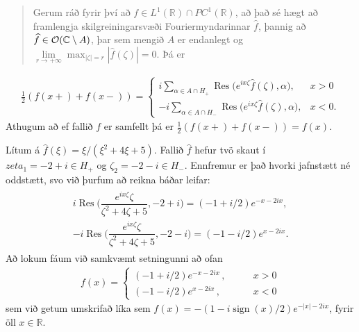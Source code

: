 \documentclass[a4paper,10pt,icelandic]{sphinxmanual}
\begin{document}
\begin{quote}

Gerum ráð fyrir því að \(f\in L^1({{\mathbb R}})\cap PC^1({{\mathbb R}})\), að það sé hægt að framlengja skilgreiningarsvæði Fourier\textendash{}myndarinnar \(\widehat f\), þannig að \(\widehat f\in {{\cal O}}({{\mathbb C}}\setminus A)\), þar sem mengið \(A\) er endanlegt og \(\lim\limits_{r\to +\infty}\max_{|\zeta|=r}|\widehat f(\zeta)|=0\). Þá er
\end{quote}
\begin{equation*}
\begin{split}\tfrac 12 (f(x+)+f(x-))=\begin{cases}
i\sum\limits_{\alpha\in A\cap H_+}{{\operatorname{Res}}}\big(e^{ix\zeta}\widehat
f(\zeta),\alpha\big), & x>0\\
-i\sum\limits_{\alpha\in A\cap H_-}{{\operatorname{Res}}}\big(e^{ix\zeta}\widehat
f(\zeta),\alpha\big), & x<0.
\end{cases}\end{split}
\end{equation*}
Athugum að ef fallið \(f\) er samfellt þá er \(\tfrac 12 (f(x+)+f(x-))= f(x)\).


Lítum á \(\widehat f(\xi)=\xi/(\xi^2+4\xi+5)\). Fallið \(\widehat f\) hefur tvö skaut í \(zeta_1 = -2+i\in H_+\) og \(\zeta_2 = -2-i\in H_-\). Ennfremur er það hvorki jafnstætt né oddstætt, svo við þurfum að reikna báðar leifar:
\begin{equation*}
\begin{split}\begin{gathered}
i{{\operatorname{Res}}}\bigg( \dfrac{e^{ix\zeta}\zeta}{\zeta^2+4\zeta+5},-2+i\bigg)
= (-1+i/2)e^{-x-2ix},\\
-i{{\operatorname{Res}}}\bigg( \dfrac{e^{ix\zeta}\zeta}{\zeta^2+4\zeta+5},-2-i\bigg)
= (-1-i/2)e^{x-2ix}.\end{gathered}\end{split}
\end{equation*}
Að lokum fáum við samkvæmt setningunni að ofan
\begin{equation*}
\begin{split}f(x) =\begin{cases}
(-1+i/2)e^{-x-2ix}\,, \qquad & x>0\\
(-1-i/2)e^{x-2ix}\,, \qquad & x<0
\end{cases}\end{split}
\end{equation*}
sem við getum umskrifað líka sem \(f(x)=-(1-i{{\operatorname{sign}}}(x)/2)e^{-|x|-2ix}\), fyrir öll  \(x\in\mathbb{R}\).
\end{document}
